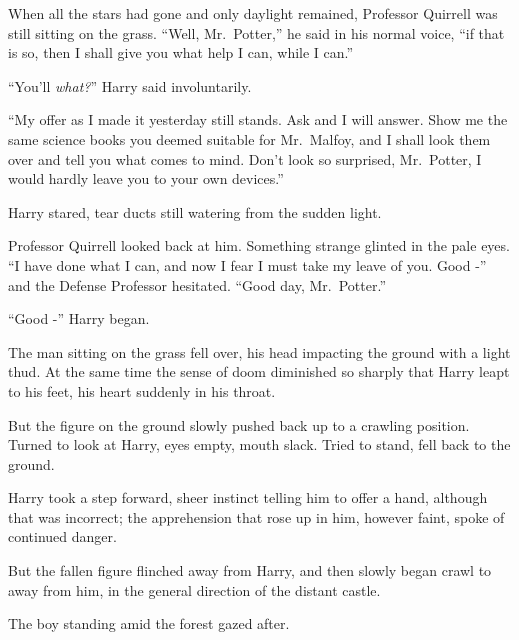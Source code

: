 When all the stars had gone and only daylight remained, Professor
Quirrell was still sitting on the grass. ``Well, Mr.~Potter,'' he said
in his normal voice, ``if that is so, then I shall give you what help I
can, while I can.''

``You'll \emph{what?}'' Harry said involuntarily.

``My offer as I made it yesterday still stands. Ask and I will answer.
Show me the same science books you deemed suitable for Mr.~Malfoy, and I
shall look them over and tell you what comes to mind. Don't look so
surprised, Mr.~Potter, I would hardly leave you to your own devices.''

Harry stared, tear ducts still watering from the sudden light.

Professor Quirrell looked back at him. Something strange glinted in the
pale eyes. ``I have done what I can, and now I fear I must take my leave
of you. Good -'' and the Defense Professor hesitated. ``Good day,
Mr.~Potter.''

``Good -'' Harry began.

The man sitting on the grass fell over, his head impacting the ground
with a light thud. At the same time the sense of doom diminished so
sharply that Harry leapt to his feet, his heart suddenly in his throat.

But the figure on the ground slowly pushed back up to a crawling
position. Turned to look at Harry, eyes empty, mouth slack. Tried to
stand, fell back to the ground.

Harry took a step forward, sheer instinct telling him to offer a hand,
although that was incorrect; the apprehension that rose up in him,
however faint, spoke of continued danger.

But the fallen figure flinched away from Harry, and then slowly began
crawl to away from him, in the general direction of the distant castle.

The boy standing amid the forest gazed after.
